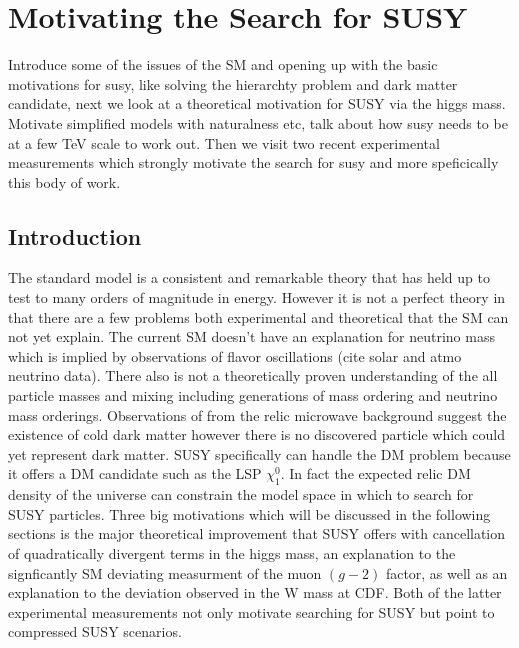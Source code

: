 
\setcounter{secnumdepth}{3}
\setcounter{tocdepth}{3}

\setlength{\parindent}{1 em}


\makeatother


\chapter{Motivating the Search for SUSY}

\begin{chapterabstract}
Introduce some of the issues of the SM and opening up with the basic motivations for susy, like solving the hierarchty problem and dark matter candidate, next we look at a theoretical motivation for SUSY via the higgs mass. Motivate simplified models with naturalness etc, talk about how susy needs to be at a few TeV scale to work out. Then we visit two recent experimental measurements which strongly motivate the search for susy and more speficically this body of work.
\end{chapterabstract}

\section{Introduction}

The standard model is a consistent and remarkable theory that has held up to test to many orders of magnitude in energy. However it is not a perfect theory in that there are a few problems both experimental and theoretical that the SM can not yet explain. The current SM doesn't have an explanation for neutrino mass which is implied by observations of flavor oscillations (cite solar and atmo neutrino data). There also is not a theoretically proven understanding of the all particle masses and mixing including generations of mass ordering and neutrino mass orderings. Observations of from the relic microwave background suggest the existence of cold dark matter however there is no discovered particle which could yet represent dark matter. SUSY specifically can handle the DM problem because it offers a DM candidate such as the LSP $\chi_1^0$. In fact the expected relic DM density of the universe can constrain the model space in which to search for SUSY particles. Three big motivations which will be discussed in the following sections is the  major theoretical improvement that SUSY offers with cancellation of quadratically divergent terms in the higgs mass, an explanation to the signficantly SM deviating measurment of the muon $(g-2)$ factor, as well as an explanation to the deviation observed in the W mass at CDF. Both of the latter experimental measurements not only motivate searching for SUSY but point to compressed SUSY scenarios.



